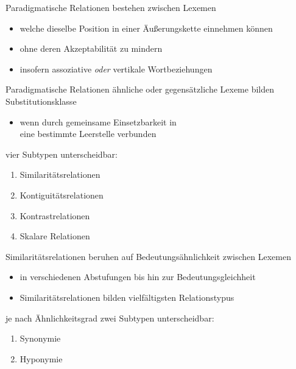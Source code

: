 \begin{frame}{Paradigmatische Relationen}
\onslide<+->
bestehen zwischen Lexemen
\Halbzeile
\begin{itemize}[<+->]
	\item		welche dieselbe Position in einer Äußerungskette einnehmen können
	\item		ohne deren Akzeptabilität zu mindern
	\item		insofern assoziative \textit{oder} vertikale Wortbeziehungen
\end{itemize}
\onslide<+->
\Zeile
\begin{exe}
	 \onslide<+->
\end{exe}
\end{frame}
			
\begin{frame}{Paradigmatische Relationen}
\onslide<+->
ähnliche oder gegensätzliche Lexeme bilden Substitutionsklasse
\Halbzeile
\begin{itemize}[<+->]
	\item		wenn durch gemeinsame Einsetzbarkeit in\\
          eine bestimmte Leerstelle verbunden
\end{itemize}
\onslide<+->
\Zeile
vier Subtypen unterscheidbar:
\Halbzeile
\begin{enumerate}[<+->]
	\item		Similaritätsrelationen
	\item		Kontiguitätsrelationen
	\item		Kontrastrelationen
	\item		Skalare Relationen
\end{enumerate}
\end{frame}

\begin{frame}{Similaritätsrelationen}
\onslide<+->
beruhen auf Bedeutungsähnlichkeit zwischen Lexemen
\Halbzeile
\begin{itemize}[<+->]
	\item		in verschiedenen Abstufungen bis hin zur Bedeutungsgleichheit
	\item		Similaritätsrelationen bilden vielfältigsten Relationstypus
\end{itemize}
\onslide<+->
\Zeile
je nach Ähnlichkeitsgrad zwei Subtypen unterscheidbar:
\Halbzeile
\begin{enumerate}[<+->]
	\item		Synonymie
	\item		Hyponymie
\end{enumerate}
\end{frame}

